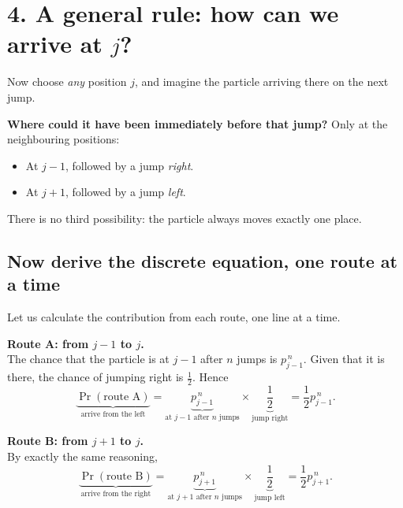 \documentclass[11pt,a4paper]{article}
\begin{document}
\clearpage
\section{4. A general rule: how can we arrive at $j$?}
Now choose \emph{any} position $j$, and imagine the particle arriving there on the next jump.

\textbf{Where could it have been immediately before that jump?} Only at the neighbouring positions:
\begin{itemize}[leftmargin=20pt,itemsep=3pt,topsep=2pt]
\item At $j-1$, followed by a jump \emph{right}.
\item At $j+1$, followed by a jump \emph{left}.
\end{itemize}
There is no third possibility: the particle always moves exactly one place.

\begin{center}
\end{center}

\subsection*{Now derive the discrete equation, one route at a time}
Let us calculate the contribution from each route, one line at a time.

\textbf{Route A: from $j-1$ to $j$.}\\
The chance that the particle is at $j-1$ after $n$ jumps is $p_{j-1}^{\,n}$. Given that it is there, the chance of jumping right is $\tfrac12$. Hence
\[
\underbrace{\Pr(\text{route A})}_{\text{arrive from the left}}
=\underbrace{p_{j-1}^{\,n}}_{\text{at $j-1$ after $n$ jumps}}
\times\underbrace{\frac12}_{\text{jump right}}
=\frac12p_{j-1}^{\,n}.
\]

\textbf{Route B: from $j+1$ to $j$.}\\
By exactly the same reasoning,
\[
\underbrace{\Pr(\text{route B})}_{\text{arrive from the right}}
=\underbrace{p_{j+1}^{\,n}}_{\text{at $j+1$ after $n$ jumps}}
\times\underbrace{\frac12}_{\text{jump left}}
=\frac12p_{j+1}^{\,n}.
\]
\end{document}

